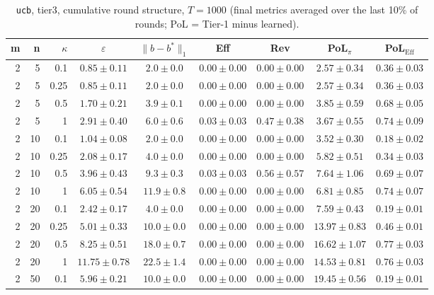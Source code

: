 \begin{table}[htbp]
\centering
\scriptsize
\caption{\texttt{ucb}, tier3, cumulative round structure, $T=1000$ (final metrics averaged over the last 10\% of rounds; PoL = Tier-1 minus learned).}
\label{tab:tier3_ucb_cumulative}
\begin{tabular}{@{}rrrcccccc@{}}
\toprule
m & n & $\kappa$ & $\varepsilon$ & $\|b-b^*\|_1$ & Eff & Rev & PoL$_\pi$ & PoL$_\mathrm{Eff}$ \\
\midrule
2 & 5 & 0.1 & $0.85 \pm 0.11$ & $2.0 \pm 0.0$ & $0.00 \pm 0.00$ & $0.00 \pm 0.00$ & $2.57 \pm 0.34$ & $0.36 \pm 0.03$ \\
2 & 5 & 0.25 & $0.85 \pm 0.11$ & $2.0 \pm 0.0$ & $0.00 \pm 0.00$ & $0.00 \pm 0.00$ & $2.57 \pm 0.34$ & $0.36 \pm 0.03$ \\
2 & 5 & 0.5 & $1.70 \pm 0.21$ & $3.9 \pm 0.1$ & $0.00 \pm 0.00$ & $0.00 \pm 0.00$ & $3.85 \pm 0.59$ & $0.68 \pm 0.05$ \\
2 & 5 & 1 & $2.91 \pm 0.40$ & $6.0 \pm 0.6$ & $0.03 \pm 0.03$ & $0.47 \pm 0.38$ & $3.67 \pm 0.55$ & $0.74 \pm 0.09$ \\
2 & 10 & 0.1 & $1.04 \pm 0.08$ & $2.0 \pm 0.0$ & $0.00 \pm 0.00$ & $0.00 \pm 0.00$ & $3.52 \pm 0.30$ & $0.18 \pm 0.02$ \\
2 & 10 & 0.25 & $2.08 \pm 0.17$ & $4.0 \pm 0.0$ & $0.00 \pm 0.00$ & $0.00 \pm 0.00$ & $5.82 \pm 0.51$ & $0.34 \pm 0.03$ \\
2 & 10 & 0.5 & $3.96 \pm 0.43$ & $9.3 \pm 0.3$ & $0.03 \pm 0.03$ & $0.56 \pm 0.57$ & $7.64 \pm 1.06$ & $0.69 \pm 0.07$ \\
2 & 10 & 1 & $6.05 \pm 0.54$ & $11.9 \pm 0.8$ & $0.00 \pm 0.00$ & $0.00 \pm 0.00$ & $6.81 \pm 0.85$ & $0.74 \pm 0.07$ \\
2 & 20 & 0.1 & $2.42 \pm 0.17$ & $4.0 \pm 0.0$ & $0.00 \pm 0.00$ & $0.00 \pm 0.00$ & $7.59 \pm 0.43$ & $0.19 \pm 0.01$ \\
2 & 20 & 0.25 & $5.01 \pm 0.33$ & $10.0 \pm 0.0$ & $0.00 \pm 0.00$ & $0.00 \pm 0.00$ & $13.97 \pm 0.83$ & $0.46 \pm 0.01$ \\
2 & 20 & 0.5 & $8.25 \pm 0.51$ & $18.0 \pm 0.7$ & $0.00 \pm 0.00$ & $0.00 \pm 0.00$ & $16.62 \pm 1.07$ & $0.77 \pm 0.03$ \\
2 & 20 & 1 & $11.75 \pm 0.78$ & $22.5 \pm 1.4$ & $0.00 \pm 0.00$ & $0.00 \pm 0.00$ & $14.53 \pm 0.81$ & $0.76 \pm 0.03$ \\
2 & 50 & 0.1 & $5.96 \pm 0.21$ & $10.0 \pm 0.0$ & $0.00 \pm 0.00$ & $0.00 \pm 0.00$ & $19.45 \pm 0.56$ & $0.19 \pm 0.01$ \\

\end{tabular}
\end{table}
